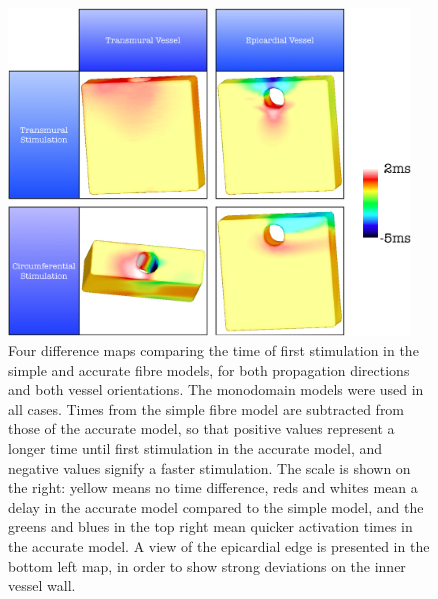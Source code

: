     \begin{figure}[htbp]
  		\centering
  	    \includegraphics[width=0.95\textwidth]{Ch5/Figs/difference_maps}
              \caption{Four difference maps comparing the time of first stimulation in the simple and accurate fibre models, for both propagation directions and both vessel orientations. The monodomain models were used in all cases. Times from the simple fibre model are subtracted from those of the accurate model, so that positive values represent a longer time until first stimulation in the accurate model, and negative values signify a faster stimulation. The scale is shown on the right: yellow means no time difference, reds and whites mean a delay in the accurate model compared to the simple model, and the greens and blues in the top right mean quicker activation times in the accurate model. A view of the epicardial edge is presented in the bottom left map, in order to show strong deviations on the inner vessel wall.}
  	  \label{fig:difference_maps}
  	\end{figure}
  	
  
